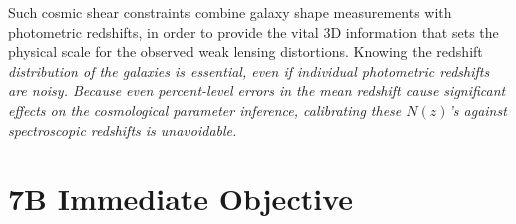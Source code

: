 \documentclass[a4paper, 10pt]{article}
\begin{document}
Such cosmic shear constraints combine galaxy shape measurements with photometric redshifts, in order to provide the vital 3D information that sets the physical scale for the observed weak lensing distortions. Knowing the redshift \em{distribution} of the galaxies is essential, even if individual photometric redshifts are noisy. Because even percent-level errors in the mean redshift cause significant effects on the cosmological parameter inference, calibrating these $N(z)$'s against spectroscopic redshifts is unavoidable.

\section*{7B Immediate Objective}
\end{document}
